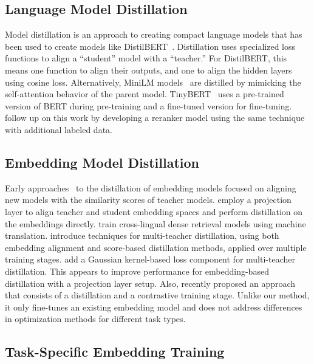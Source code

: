 \documentclass[11pt]{article}
\begin{document}
\subsection{Language Model Distillation}
Model distillation is an approach to creating compact language models that has been used to create models like DistilBERT~\cite{sanh2019distilbert}. Distillation uses specialized loss functions to align a “student” model with a “teacher.” For DistilBERT, this means one function to align their outputs, and one to align the hidden layers using cosine loss.
Alternatively, MiniLM models~\cite{wang2020minilm} are distilled by mimicking the self-attention behavior of the parent model.
TinyBERT~\cite{jiao2020tinybert} uses a pre-trained version of BERT during pre-training and a fine-tuned version for fine-tuning.
\citet{chen2021simplified} follow up on this work by developing a reranker model using the same technique with additional labeled data.


\subsection{Embedding Model Distillation}
Early approaches~\cite{hofstatter2020improving,menon2022defense} to the distillation of embedding models focused on aligning new models with the similarity scores of teacher models. \citet{kim2023embeddistill} employ a projection layer to align teacher and student embedding spaces and perform distillation on the embeddings directly.
\citet{yang2024translate,musacchio2025xvlm2vec} train cross-lingual dense retrieval models using machine translation.
\citet{zhang2024jasper} introduce techniques for multi-teacher distillation, using both embedding alignment and score-based distillation methods, applied over multiple training stages.
\citet{formontlearning} add a Gaussian kernel-based loss component for multi-teacher distillation. This appears to improve performance for embedding-based distillation with a projection layer setup.
Also, \citet{zhang2025jasper} recently proposed an approach that consists of a distillation and a contrastive training stage.
Unlike our method, it only fine-tunes an existing embedding model and does not address differences in optimization methods for different task types.


\subsection{Task-Specific Embedding Training}
\end{document}
